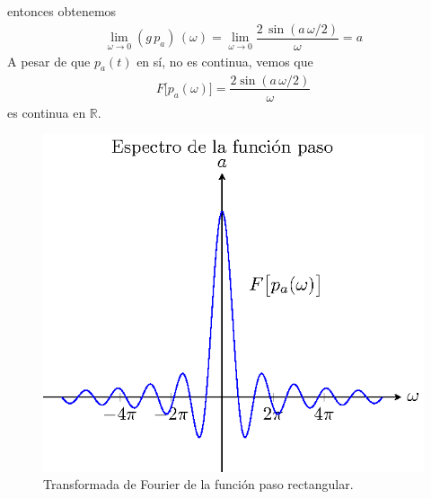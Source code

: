 entonces obtenemos 
\begin{align*}
\lim_{\omega \to 0}  (g \, p_{a}) \, (\omega) = \lim_{\omega \to 0} \dfrac{2 \, \sin (a \, \omega /2)}{\omega} = a
\end{align*}
A pesar de que $p_{a}(t)$ en sí, no es continua, vemos que
\begin{align}
F \big[p_{a}(\omega)\big] = \dfrac{2 \sin (a \, \omega/2)}{\omega}
\label{eq:ecuacion_06_11_Beerends}
\end{align}
es continua en $\mathbb{R}$.
\begin{figure}[H]
    \centering
    \includegraphics[scale=1.3]{Imagenes/T_Funcionpaso.eps}
    \caption{Transformada de Fourier de la función paso rectangular.}
    \label{fig:figura_Tfuncionpaso}
\end{figure}
%     

